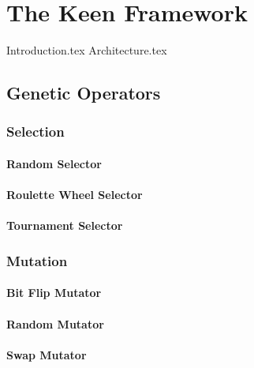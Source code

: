 \chapter{The Keen Framework}
\label{chap:keen}
  {Introduction.tex}
  {Architecture.tex}

  \section{Genetic Operators}
  \label{sec:keen:operators}
    \subsection{Selection}
    \label{sec:keen:operators:selection}
      \subsubsection{Random Selector}
      \label{sec:keen:operators:selection:random}
        \Blindtext
      \subsubsection{Roulette Wheel Selector}
      \label{sec:keen:operators:selection:roulette_wheel}
        \Blindtext
      \subsubsection{Tournament Selector}
      \label{sec:keen:operators:selection:tournament}
        \Blindtext
    \subsection{Mutation}
    \label{sec:keen:operators:mutation}
      \subsubsection{Bit Flip Mutator}
      \label{sec:keen:operators:mutation:bit_flip}
        \Blindtext
      \subsubsection{Random Mutator}
      \label{sec:keen:operators:mutation:simple}
        \Blindtext
      \subsubsection{Swap Mutator}
      \label{sec:keen:operators:mutation:swap}
        \Blindtext
